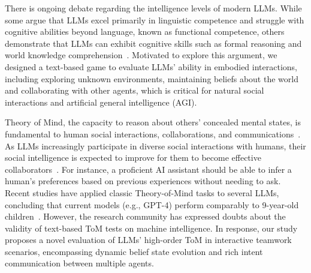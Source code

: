 \documentclass[11pt]{article}
\begin{document}
There is ongoing debate regarding the intelligence levels of modern LLMs. While some argue that LLMs excel primarily in linguistic competence and struggle with cognitive abilities beyond language, known as functional competence, others demonstrate that LLMs can exhibit cognitive skills such as formal reasoning and world knowledge comprehension~\cite{mahowald2023dissociating,bubeck2023sparks}. Motivated to explore this argument, we designed a text-based game to evaluate LLMs' ability in embodied interactions, including exploring unknown environments, maintaining beliefs about the world and collaborating with other agents, which is critical for natural social interactions and artificial general intelligence (AGI).

Theory of Mind, the capacity to reason about others' concealed mental states, is fundamental to human social interactions, collaborations, and communications~\cite{zhang2012perspective}. As LLMs increasingly participate in diverse social interactions with humans, their social intelligence is expected to improve for them to become effective collaborators~\cite{williams2022supporting,li2022theory}. For instance, a proficient AI assistant should be able to infer a human's preferences based on previous experiences without needing to ask. Recent studies have applied classic Theory-of-Mind tasks to several LLMs, concluding that current models (e.g., GPT-4) perform comparably to 9-year-old children~\cite{kosinski2023theory}. However, the research community has expressed doubts about the validity of text-based ToM tests on machine intelligence\cite{ullman2023large,sap2023neural}. In response, our study proposes a novel evaluation of LLMs' high-order ToM in interactive teamwork scenarios, encompassing dynamic belief state evolution and rich intent communication between multiple agents.


\end{document}

